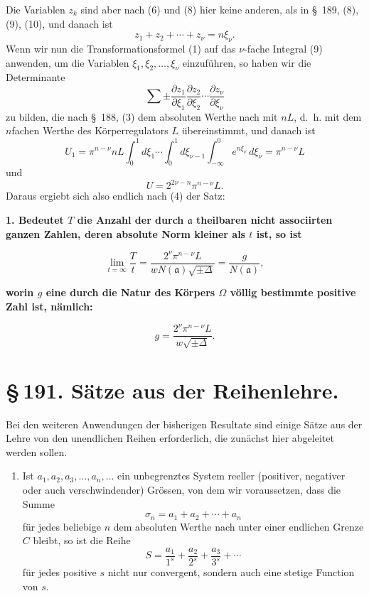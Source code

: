 \documentclass[11pt]{article}
\begin{document}
Die Variablen $z_k$ sind aber nach (6) und (8) hier keine anderen, als in \S~189, (8), (9), (10), und danach ist
\[
z_1+z_2+\cdots+z_\nu=n\xi_\nu.
\]
Wenn wir nun die Transformationsformel (1) auf das $\nu$-fache Integral (9) anwenden, um die Variablen $\xi_1,\xi_2,\ldots,\xi_\nu$ einzuführen, so haben wir die Determinante
\[
\sum\pm
\frac{\partial z_1}{\partial\xi_1}
\frac{\partial z_2}{\partial\xi_2}\cdots
\frac{\partial z_\nu}{\partial\xi_\nu}
\]
zu bilden, die nach \S~188, (3) dem absoluten Werthe nach mit $nL$, d.~h. mit dem $n$fachen Werthe des Körperregulators $L$ übereinstimmt, und danach ist
\[
U_1=\pi^{n-\nu}nL\int_0^1d\xi_1\cdots\int_0^1d\xi_{\nu-1}\int_{-\infty}^{0}e^{n\xi_\nu}\,d\xi_\nu
=\pi^{n-\nu}L
\]
und
\[
U=2^{2\nu-n}\pi^{n-\nu}L.
\]
Daraus ergiebt sich also endlich nach (4) der Satz:

\begin{center}
\textbf{1. Bedeutet $T$ die Anzahl der durch $\mathfrak a$ theilbaren nicht associirten ganzen Zahlen, deren absolute Norm kleiner als $t$ ist, so ist}
\end{center}
\begin{equation}
\lim_{t=\infty}\frac{T}{t}
=
\frac{2^\nu\pi^{n-\nu}L}{wN(\mathfrak a)\sqrt{\pm\Delta}}
=
\frac{g}{N(\mathfrak a)},
\tag{10}
\end{equation}
\begin{center}
\textbf{worin $g$ eine durch die Natur des Körpers $\Omega$ völlig bestimmte positive Zahl ist, nämlich:}
\end{center}
\begin{equation}
g=\frac{2^\nu\pi^{n-\nu}L}{w\sqrt{\pm\Delta}}.
\tag{11}
\end{equation}

\clearpage
\section*{\S\,191. Sätze aus der Reihenlehre.}

Bei den weiteren Anwendungen der bisherigen Resultate sind einige Sätze aus der Lehre von den unendlichen Reihen erforderlich, die zunächst hier abgeleitet werden sollen.

\begin{enumerate}[label=\textbf{\arabic*.},leftmargin=2.2em]
\item Ist $a_1,a_2,a_3,\ldots,a_n,\ldots$ ein unbegrenztes System reeller (positiver, negativer oder auch verschwindender) Grössen, von dem wir voraussetzen, dass die Summe
\begin{equation}
\sigma_n=a_1+a_2+\cdots+a_n
\tag{1}
\end{equation}
für jedes beliebige $n$ dem absoluten Werthe nach unter einer endlichen Grenze $C$ bleibt, so ist die Reihe
\begin{equation}
S=\frac{a_1}{1^s}+\frac{a_2}{2^s}+\frac{a_3}{3^s}+\cdots
\tag{2}
\end{equation}
für jedes positive $s$ nicht nur convergent, sondern auch eine stetige Function von $s$.
\end{enumerate}
\end{document}
